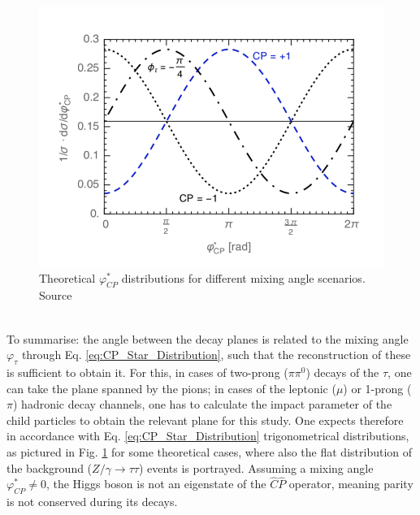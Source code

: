 \begin{figure}[h]
	\centering
	\includegraphics[width=0.5\linewidth]{Figures/Phi_star_distribution}
	\caption{Theoretical $\varphi_{CP}^*$ distributions for different mixing angle scenarios. Source \parencite{Berge_CP_Prospects}}
	\label{fig:phistardistribution}
\end{figure}\\
To summarise: the angle between the decay planes is related to the mixing angle $\varphi_\tau$ through Eq. \ref{eq:CP_Star_Distribution}, such that the reconstruction of these is sufficient to obtain it. For this, in cases of two-prong ($\pi\pi^0$) decays of the $\tau$, one can take the plane spanned by the pions; in cases of the leptonic ($\mu$) or 1-prong ($\pi$) hadronic decay channels, one has to calculate the impact parameter of the child particles to obtain the relevant plane for this study. One expects therefore in accordance with Eq. \ref{eq:CP_Star_Distribution} trigonometrical distributions, as pictured in Fig. \ref{fig:phistardistribution} for some theoretical cases, where also the flat distribution of the background ($Z/\gamma \rightarrow \tau\tau$) events is portrayed. Assuming a mixing angle $\varphi_{CP}^* \neq 0$, the Higgs boson is not an eigenstate of the $\hat{C}\hat{P}$ operator, meaning parity is not conserved during its decays.


